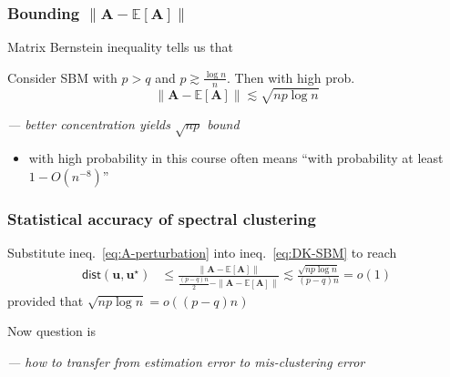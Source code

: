 \documentclass[compress,
mathserif,wide,%
]{beamer}
\begin{document}
\begin{frame}
\frametitle{Bounding $\| \bm{A}-\mathbb{E}[\bm{A}] \|$}

Matrix Bernstein inequality tells us that 
%
\begin{lemma}
\label{lem:perturbation-SBM}
%
Consider SBM with $p>q$ and $p\gtrsim \frac{\log n}{n}$. Then with high prob. 
%
\begin{equation}
	\label{eq:A-perturbation}
	\|\bm{A}-\mathbb{E}[\bm{A}]\|\lesssim \sqrt{np \log n} 
\end{equation}
%
\end{lemma}

{\hfill \em --- better concentration yields $\sqrt{np}$ bound}

\vfill

\begin{itemize}
	\item with high probability in this course often means ``with probability at least $1 - O(n^{-8})$''
\end{itemize}
\end{frame}



\begin{frame}
\frametitle{Statistical accuracy of spectral clustering}

Substitute ineq.~\eqref{eq:A-perturbation} into  ineq.~\eqref{eq:DK-SBM} to reach
%
\begin{align*}
	\mathsf{dist}( {\bm{u}}, \bm{u}^{\star}) &\leq \frac{\|\bm{A}-\mathbb{E}[\bm{A}]\|}{\frac{(p-q)n}{2}-\|\bm{A}-\mathbb{E}[\bm{A}]\|}  \lesssim \frac{\sqrt{np \log n}}{(p-q)n} = o(1)
\end{align*}
%
provided that $\sqrt{np \log n} = o((p-q)n)$

\vfill 

Now question is 


{\em \hfill --- how to transfer from estimation error to mis-clustering error}
%


\end{frame}
\end{document}
